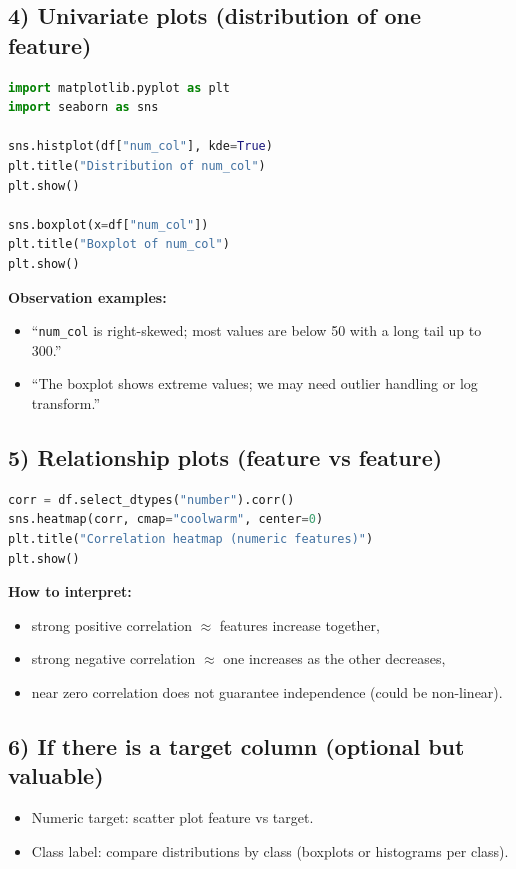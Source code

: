 \documentclass[11pt]{article}
\begin{document}
\subsection{4) Univariate plots (distribution of one feature)}
\begin{lstlisting}[language=Python]
import matplotlib.pyplot as plt
import seaborn as sns

sns.histplot(df["num_col"], kde=True)
plt.title("Distribution of num_col")
plt.show()

sns.boxplot(x=df["num_col"])
plt.title("Boxplot of num_col")
plt.show()
\end{lstlisting}
\textbf{Observation examples:}
\begin{itemize}[leftmargin=*]
  \item ``\texttt{num\_col} is right-skewed; most values are below 50 with a long tail up to 300.''
  \item ``The boxplot shows extreme values; we may need outlier handling or log transform.''
\end{itemize}

\subsection{5) Relationship plots (feature vs feature)}
\begin{lstlisting}[language=Python]
corr = df.select_dtypes("number").corr()
sns.heatmap(corr, cmap="coolwarm", center=0)
plt.title("Correlation heatmap (numeric features)")
plt.show()
\end{lstlisting}
\textbf{How to interpret:}
\begin{itemize}[leftmargin=*]
  \item strong positive correlation $\approx$ features increase together,
  \item strong negative correlation $\approx$ one increases as the other decreases,
  \item near zero correlation does not guarantee independence (could be non-linear).
\end{itemize}

\subsection{6) If there is a target column (optional but valuable)}
\begin{itemize}[leftmargin=*]
  \item Numeric target: scatter plot feature vs target.
  \item Class label: compare distributions by class (boxplots or histograms per class).
\end{itemize}
\end{document}
